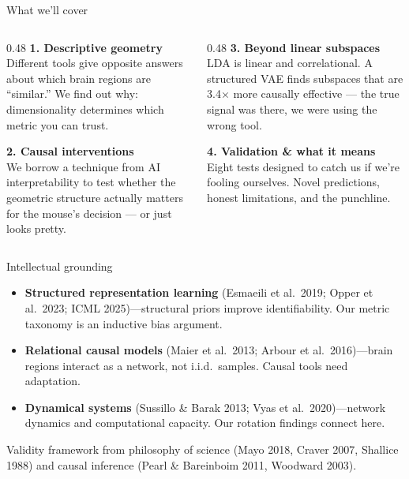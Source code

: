 \documentclass[aspectratio=169,11pt]{beamer}
\begin{document}
\begin{frame}{What we'll cover}
\begin{columns}[T]
\begin{column}{0.48\textwidth}
\textbf{1. Descriptive geometry}\\[0.2em]
{\small Different tools give opposite answers about which brain regions are ``similar.'' We find out why: dimensionality determines which metric you can trust.}

\vspace{0.6em}
\textbf{2. Causal interventions}\\[0.2em]
{\small We borrow a technique from AI interpretability to test whether the geometric structure actually matters for the mouse's decision --- or just looks pretty.}
\end{column}
\begin{column}{0.48\textwidth}
\textbf{3. Beyond linear subspaces}\\[0.2em]
{\small LDA is linear and correlational. A structured VAE finds subspaces that are 3.4$\times$ more causally effective --- the true signal was there, we were using the wrong tool.}

\vspace{0.6em}
\textbf{4. Validation \& what it means}\\[0.2em]
{\small Eight tests designed to catch us if we're fooling ourselves. Novel predictions, honest limitations, and the punchline.}
\end{column}
\end{columns}
\end{frame}

\begin{frame}{Intellectual grounding}
\begin{itemize}\setlength\itemsep{3pt}
  \item {\small \textbf{Structured representation learning} (Esmaeili et al.\ 2019; Opper et al.\ 2023; ICML 2025)---structural priors improve identifiability. Our metric taxonomy is an inductive bias argument.}
  \item {\small \textbf{Relational causal models} (Maier et al.\ 2013; Arbour et al.\ 2016)---brain regions interact as a network, not i.i.d.\ samples. Causal tools need adaptation.}
  \item {\small \textbf{Dynamical systems} (Sussillo \& Barak 2013; Vyas et al.\ 2020)---network dynamics and computational capacity. Our rotation findings connect here.}
\end{itemize}

\vspace{0.3em}
{\small Validity framework from philosophy of science (Mayo 2018, Craver 2007, Shallice 1988) and causal inference (Pearl \& Bareinboim 2011, Woodward 2003).}
\end{frame}
\end{document}
